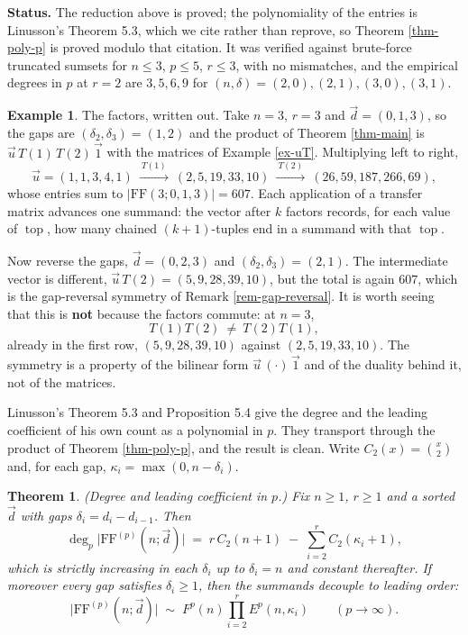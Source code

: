 \documentclass[11pt, a4paper, abstract=yes]{scrartcl}
\theoremstyle{definition}
\newtheorem{mexample}[definition]{Example}
\theoremstyle{remark}
\theoremstyle{plain}
\newtheorem{theorem}[definition]{Theorem}
\newcommand{\tp}{\operatorname{top}}
\begin{document}
\textbf{Status.} The reduction above is proved; the polynomiality of the entries is Linusson's Theorem 5.3,
which we cite rather than reprove, so Theorem \ref{thm-poly-p} is proved modulo that citation. It was
verified against brute-force truncated sumsets for \(n\le3\), \(p\le5\), \(r\le3\), with no
mismatches, and the empirical degrees in \(p\) at \(r=2\) are \(3,5,6,9\) for
\((n,\delta)=(2,0),(2,1),(3,0),(3,1)\).

\begin{mexample}
The factors, written out. Take \(n=3\), \(r=3\) and \(\vec d=(0,1,3)\), so the gaps are
\((\delta_2,\delta_3)=(1,2)\) and the product of Theorem \ref{thm-main} is \(\vec u\,T(1)\,T(2)\,\vec1\)
with the matrices of Example \ref{ex-uT}. Multiplying left to right,
\[
  \vec u=(1,1,3,4,1)
  \ \xrightarrow{\ T(1)\ }\ (2,5,19,33,10)
  \ \xrightarrow{\ T(2)\ }\ (26,59,187,266,69),
\]
whose entries sum to \(\lvert\mathrm{FF}(3;0,1,3)\rvert=607\). Each application of a transfer matrix
advances one summand: the vector after \(k\) factors records, for each value of \(\tp\), how many
chained \((k+1)\)-tuples end in a summand with that \(\tp\).

Now reverse the gaps, \(\vec d=(0,2,3)\) and \((\delta_2,\delta_3)=(2,1)\). The intermediate vector is
different, \(\vec u\,T(2)=(5,9,28,39,10)\), but the total is again \(607\), which is the
gap-reversal symmetry of Remark \ref{rem-gap-reversal}. It is worth seeing that this is \textbf{not} because
the factors commute: at \(n=3\),
\[
  T(1)T(2)\ \ne\ T(2)T(1),
\]
already in the first row, \((5,9,28,39,10)\) against \((2,5,19,33,10)\). The symmetry is a property of
the bilinear form \(\vec u\,(\cdot)\,\vec1\) and of the duality behind it, not of the matrices.
\label{ex-factors}
\end{mexample}

Linusson's Theorem 5.3 and Proposition 5.4 give the degree and the leading coefficient of his own
count as a polynomial in \(p\). They transport through the product of Theorem \ref{thm-poly-p}, and the
result is clean. Write \(C_2(x)=\binom x2\) and, for each gap, \(\kappa_i=\max(0,n-\delta_i)\).

\begin{theorem}
(\emph{Degree and leading coefficient in \(p\).}) Fix \(n\ge1\), \(r\ge1\) and a sorted \(\vec d\) with
gaps \(\delta_i=d_i-d_{i-1}\). Then
\begin{equation}\label{eq:degree-in-p}
  \deg_p\lvert\mathrm{FF}^{(p)}(n;\vec d)\rvert
   \;=\; r\,C_2(n+1)\;-\;\sum_{i=2}^{r}C_2(\kappa_i+1),
\end{equation}
which is strictly increasing in each \(\delta_i\) up to \(\delta_i=n\) and constant thereafter. If
moreover every gap satisfies \(\delta_i\ge1\), then the summands decouple to leading order:
\begin{equation}\label{eq:lc-in-p}
  \lvert\mathrm{FF}^{(p)}(n;\vec d)\rvert\;\sim\;F^p(n)\prod_{i=2}^{r}E^p(n,\kappa_i)
  \qquad(p\to\infty).
\end{equation}
\label{thm-asymptotics-p}
\end{theorem}
\end{document}
